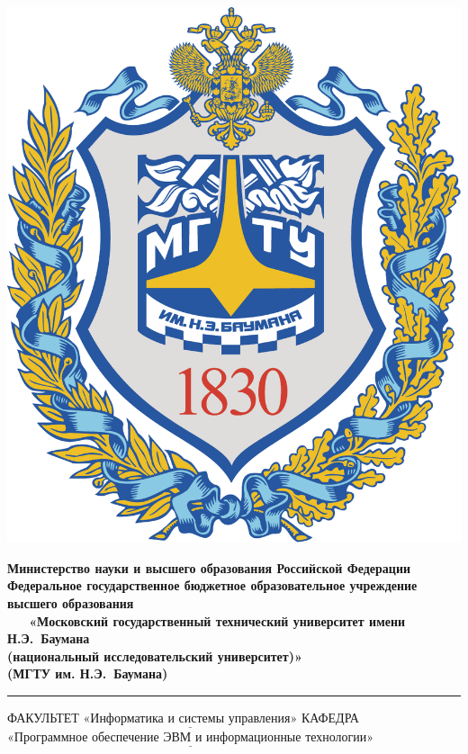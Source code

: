 \thispagestyle{empty}
\begin{titlepage}
	\noindent \begin{minipage}{0.15\textwidth}
				  \includegraphics[width=\linewidth]{img/b_logo}
	\end{minipage}
	\noindent\begin{minipage}{0.9\textwidth}
				 \centering
				 \textbf{Министерство науки и высшего образования Российской Федерации}\\
				 \textbf{Федеральное государственное бюджетное образовательное учреждение высшего образования}\\
				 \textbf{~~~«Московский государственный технический университет имени Н.Э.~Баумана}\\
				 \textbf{(национальный исследовательский университет)»}\\
				 \textbf{(МГТУ им. Н.Э.~Баумана)}
	\end{minipage}

	\noindent\rule{18cm}{3pt}
	\newline\newline
	\noindent ФАКУЛЬТЕТ $\underline{\text{«Информатика и системы управления»}}$ \newline\newline
	\noindent КАФЕДРА $\underline{\text{«Программное обеспечение ЭВМ и информационные технологии»}}$\newline\newline\newline\newline\newline



\end{titlepage}
